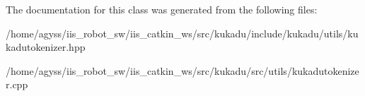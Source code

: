 The documentation for this class was generated from the following files\+:\begin{DoxyCompactItemize}
\item 
/home/agyss/iis\+\_\+robot\+\_\+sw/iis\+\_\+catkin\+\_\+ws/src/kukadu/include/kukadu/utils/kukadutokenizer.\+hpp\item 
/home/agyss/iis\+\_\+robot\+\_\+sw/iis\+\_\+catkin\+\_\+ws/src/kukadu/src/utils/kukadutokenizer.\+cpp\end{DoxyCompactItemize}

